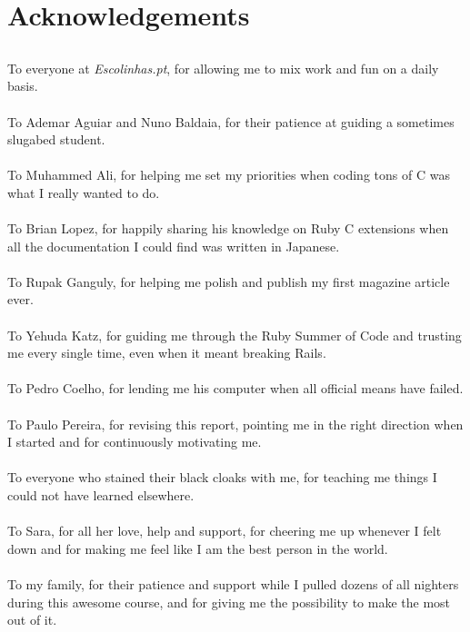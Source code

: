 \chapter*{Acknowledgements}
\section*{}
To everyone at \textit{Escolinhas.pt}, for allowing me to mix work and fun on a daily basis.\\
\mbox{}\\
To Ademar Aguiar and Nuno Baldaia, for their patience at guiding a sometimes slugabed student.\\
\mbox{}\\
To Muhammed Ali, for helping me set my priorities when coding tons of C was what I really wanted to do.\\
\mbox{}\\
To Brian Lopez, for happily sharing his knowledge on Ruby C extensions when all the documentation I could find was written in Japanese.\\
\mbox{}\\
To Rupak Ganguly, for helping me polish and publish my first magazine article ever.\\
\mbox{}\\
To Yehuda Katz, for guiding me through the Ruby Summer of Code and trusting me every single time, even when it meant breaking Rails.\\
\mbox{}\\
To Pedro Coelho, for lending me his computer when all official means have failed.\\
\mbox{}\\
To Paulo Pereira, for revising this report, pointing me in the right direction when I started and for continuously motivating me.\\
\mbox{}\\
To everyone who stained their black cloaks with me, for teaching me things I could not have learned elsewhere.\\
\mbox{}\\
To Sara, for all her love, help and support, for cheering me up whenever I felt down and for making me feel like I am the best person in the world.\\
\mbox{}\\
To my family, for their patience and support while I pulled dozens of all nighters during this awesome course, and for giving me the possibility to make the most out of it.\\
